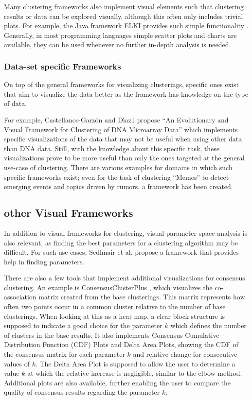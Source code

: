 \documentclass[
	a4paper,
	english,
	twoside,
	openright,               
	11pt                            
	]{report}
\begin{document}
Many clustering frameworks also implement visual elements such that clustering results or data can be explored visually, although this often only includes trivial plots. For example, the Java framework ELKI provides such simple functionality \cite{10.14778/2824032.2824115}. Generally, in most programming languages simple scatter plots and charts are available, they can be used whenever no further in-depth analysis is needed.

\subsubsection{Data-set specific Frameworks}
On top of the general frameworks for visualizing clusterings, specific ones exist that aim to visualize the data better as the framework has knowledge on the type of data. 

For example, Castellanos-Garz\'{o}n and D\'{ı}az1 \cite{DNAVis} propose ``An Evolutionary and Visual Framework for Clustering of DNA Microarray Data'' which implements specific visualizations of the data that may not be useful when using other data than DNA data. Still, with the knowledge about this specific task, these visualizations prove to be more useful than only the ones targeted at the general use-case of clustering. There are various examples for domains in which such specific frameworks exist; even for the task of clustering ``Memes'' \cite{Dang2017} to detect emerging events and topics driven by rumors, a framework has been created.

\subsection{other Visual Frameworks}

In addition to visual frameworks for clustering, visual parameter space analysis is also relevant, as finding the best parameters for a clustering algorithm may be difficult. For such use-cases, Sedlmair et al. \cite{6876043} propose a framework that provides help in finding parameters.

There are also a few tools that implement additional visualizations for consensus clustering. An example is ConsensusClusterPlus \cite{10.1093/bioinformatics/btq170}, which visualizes the co-association matrix created from the base clusterings. This matrix represents how often two points occur in a common cluster relative to the number of base clusterings. When looking at this as a heat map, a clear block structure is supposed to indicate a good choice for the parameter $k$ which defines the number of clusters in the base results. It also implements Consensus Cumulative Distribution Function (CDF) Plots and Delta Area Plots, showing the CDF of the consensus matrix for each parameter $k$ and relative change for consecutive values of $k$. The Delta Area Plot is supposed to allow the user to determine a value $k$ at which the relative increase is negligible, similar to the elbow-method. Additional plots are also available, further enabling the user to compare the quality of consensus results regarding the parameter $k$.
\end{document}
